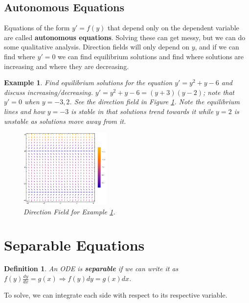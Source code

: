 \documentclass[letterpaper, 11pt, openany]{book}
\theoremstyle{mytheoremstyle}
\newtheorem{definition}{Definition}[section]
\theoremstyle{myexamplestyle}
\newtheorem{example}{Example}[section]
\begin{document}
\subsection{Autonomous Equations}
Equations of the form \(y' = f(y)\) that depend only on the dependent variable are called \textbf{autonomous equations}. Solving these can get messy, but we can do some qualitative analysis. Direction fields will only depend on \(y\), and if we can find where \(y' = 0\) we can find equilibrium solutions and find where solutions are increasing and where they are decreasing.

\begin{example}\label{e:de-aut-dir-field}
    Find equilibrium solutions for the equation \(y' = y^{2} + y - 6\) and discuss increasing/decreasing.
    \(y' = y^{2} + y - 6 = (y+3)(y-2)\); note that \(y'=0\) when \(y=-3,2\). See the direction field in Figure \ref{f:de-aut-dir-field}. Note the equilibrium lines and how \(y = -3\) is stable in that solutions trend towards it while \(y=2\) is unstable as solutions move away from it.
    \begin{figure}[htbp]
        \centering
            \includegraphics[width=0.4\textwidth]{Figures/de-aut-dfield.pdf}
        \caption{Direction Field for Example \ref{e:de-aut-dir-field}.}
        \label{f:de-aut-dir-field}
    \end{figure}
\end{example}

\section{Separable Equations}
\setcounter{figure}{0}
\begin{definition}\label{d:separable-eqn}
    An ODE is \textbf{separable} if we can write it as \(f(y)\frac{dy}{dx} = g(x) \Rightarrow f(y)dy = g(x)dx\).
\end{definition}

To solve, we can integrate each side with respect to its respective variable. \faSmile
\end{document}
